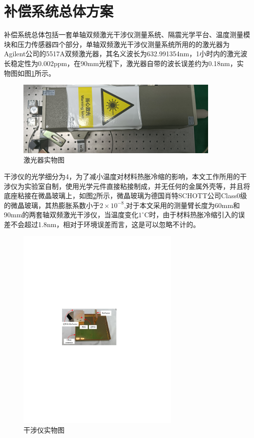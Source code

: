 \section{补偿系统总体方案}
补偿系统总体包括一套单轴双频激光干涉仪测量系统、隔震光学平台、温度测量模块和压力传感器四个部分，单轴双频激光干涉仪测量系统所用的的激光器为Agilent公司的5517A双频激光器，其名义波长为632.991354nm，1小时内的激光波长稳定性为0.002ppm，在90mm光程下，激光器自带的波长误差约为0.18nm，实物图如图\ref{fig:激光器实物图}所示。
\begin{figure}[htb]
    \centering
    \includegraphics[width=10cm]{fig/3-fig/激光器实物图.png}
    \caption{激光器实物图}
    \label{fig:激光器实物图}
\end{figure}

干涉仪的光学细分为4，为了减小温度对材料热胀冷缩的影响，本文工作所用的干涉仪为实验室自制，使用光学元件直接粘接制成，并无任何的金属外壳等，并且将底座粘接在微晶玻璃上，如图\ref{fig:干涉仪实物图}所示，微晶玻璃为德国肖特SCHOTT公司Class0级的微晶玻璃，其热膨胀系数小于$2\times 10^{-8}$,对于本文采用的测量臂长度为60mm和90mm的两套轴双频激光干涉仪，当温度变化$1^{\circ} \mathrm{C}$时，由于材料热胀冷缩引入的误差不会超过1.8nm，相对于环境误差而言，这是可以忽略不计的。
\begin{figure}[htb]
    \centering
    \includegraphics[width=8cm]{fig/3-fig/干涉仪实物图.pdf}
    \caption{干涉仪实物图}
    \label{fig:干涉仪实物图}
\end{figure}

